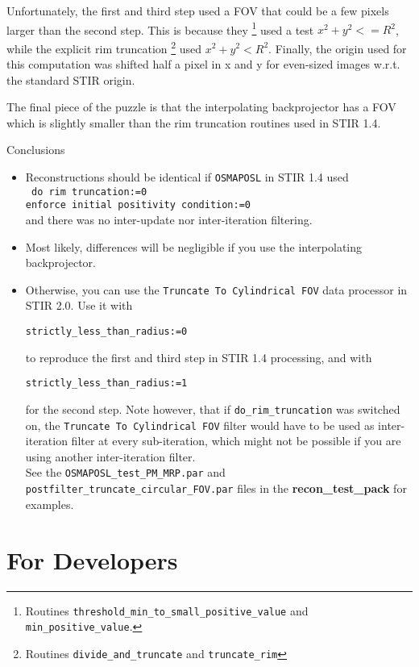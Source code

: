 \documentclass{article}
\begin{document}
Unfortunately, the first and third step used a FOV that could be
a few pixels larger than the second step. This is 
because they
\footnote{Routines \texttt{threshold\_min\_to\_small\_positive\_value}
and \texttt{min\_positive\_value}.}
 used a test $x^2+y^2 <= R^2$, while the explicit rim
truncation
\footnote{Routines \texttt{divide\_and\_truncate} and \texttt{truncate\_rim}}
 used $x^2+y^2 < R^2$.
Finally, the origin used for this computation was shifted half a pixel in 
x and y for even-sized images w.r.t. the standard STIR origin.

The final piece of the puzzle is that the interpolating backprojector has a 
FOV which is slightly smaller than the rim truncation routines used in 
STIR 1.4.

Conclusions
\begin{itemize}
\item Reconstructions should be identical if \texttt{OSMAPOSL} in 
STIR 1.4 used\\
\texttt{
do rim truncation:=0\\
enforce initial positivity condition:=0
}\\
and there was no inter-update nor inter-iteration filtering.

\item Most likely, differences will be negligible if you use the interpolating
backprojector.

\item Otherwise, you can use the \texttt{Truncate To Cylindrical FOV}
data processor in STIR 2.0. Use it with
\begin{verbatim}
strictly_less_than_radius:=0
\end{verbatim}
to reproduce the first and third step in STIR 1.4 processing, and with
\begin{verbatim}
strictly_less_than_radius:=1
\end{verbatim}
for the second step. Note however, that if
\texttt{do\_rim\_truncation} was switched on, the 
\texttt{Truncate To Cylindrical FOV} filter would have to be used
as inter-iteration filter at every sub-iteration, which might not be 
possible if you are using another inter-iteration filter.\\
See the \texttt{OSMAPOSL\_test\_PM\_MRP.par}
and \texttt{postfilter\_truncate\_circular\_FOV.par} files in the 
\textbf{recon\_test\_pack} for examples. 
\end{itemize}


\section{For Developers}
\end{document}
